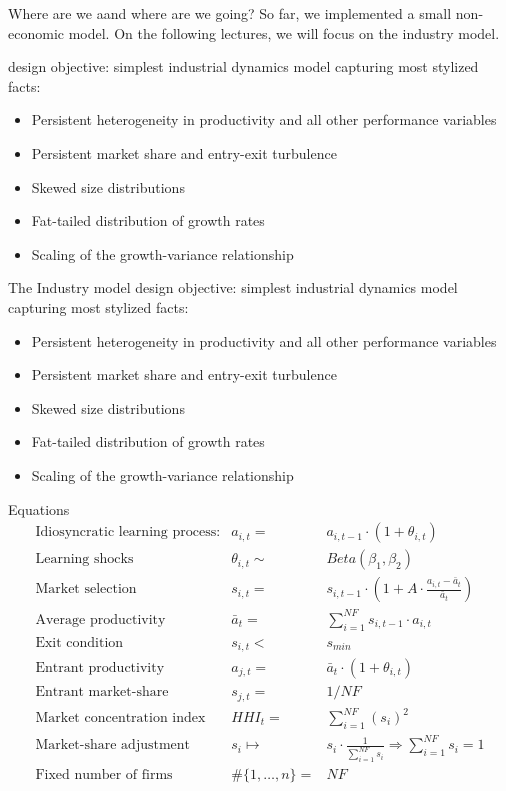 \documentclass[bigger,aspectratio=169]{beamer}
\begin{document}
\begin{frame}[label={sec:org271ce29}]{Where are we aand where are we going?}
So far, we implemented a small non-economic model.
On the following lectures, we will focus on the \alert{industry model}.

\textcite{dosi_2017_footprint} design objective: simplest industrial dynamics model capturing most \alert{stylized facts}:
\begin{itemize}
\item Persistent heterogeneity in productivity and all other performance variables
\item Persistent market share and entry-exit turbulence
\item Skewed size distributions
\item Fat-tailed distribution of growth rates
\item Scaling of the growth-variance relationship
\end{itemize}
\end{frame}
\begin{frame}[label={sec:orgea28d5f}]{The Industry model}
\textcite{dosi_2017_footprint} design objective: simplest industrial dynamics model capturing most \alert{stylized facts}:
\begin{itemize}
\item Persistent heterogeneity in productivity and all other performance variables
\item Persistent market share and entry-exit turbulence
\item Skewed size distributions
\item Fat-tailed distribution of growth rates
\item Scaling of the growth-variance relationship
\end{itemize}
\end{frame}
\begin{frame}[label={sec:orga61563d}]{Equations}
\[ \begin{array}{lrl}
\mbox{Idiosyncratic learning process:} & a_{i,t} = &a_{i,t-1}\cdot (1 + \theta_{i,t})\\
\mbox{Learning shocks} & \theta_{i,t} \sim  & Beta(\beta_1, \beta_2)\\
\mbox{Market selection} & s_{i,t} =  & s_{i,t-1} \cdot \left( 1 + A\cdot\frac{a_{i,t} - \bar{a}_{t}}{\bar{a}_{t}}\right) \\
\mbox{Average productivity} & \bar{a}_{t} =  & \sum_{i=1}^{NF} s_{i, t-1}\cdot a_{i,t} \\
\mbox{Exit condition} & s_{i,t} < & s_{min}\\
\mbox{Entrant productivity} & a_{j,t} =&  \bar{a}_{t}\cdot (1 + \theta_{i,t})\\
\mbox{Entrant market-share} & s_{j,t} =& 1/NF \\
\mbox{Market concentration index} & HHI_{t} =& \sum_{i=1}^{NF} (s_{i})^2 \\
\mbox{Market-share adjustment} &  s_{i} \mapsto & s_{i}\cdot \frac{1}{\sum_{i=1}^{NF} s_{i}} \Rightarrow \sum_{i=1}^{NF} s_{i} = 1 \\
\mbox{Fixed number of firms} & \#\{1, \ldots, n\} =& NF
\end{array}\]
\end{frame}
\end{document}
